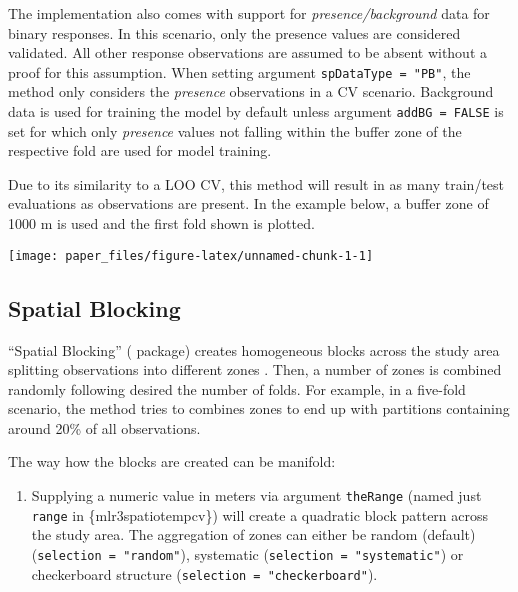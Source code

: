 \documentclass[
]{jss}
\providecommand{\tightlist}{%
  \setlength{\itemsep}{0pt}\setlength{\parskip}{0pt}}
\begin{document}
The implementation also comes with support for
\emph{presence/background} data for binary responses. In this scenario,
only the presence values are considered validated. All other response
observations are assumed to be absent without a proof for this
assumption. When setting argument \texttt{spDataType\ =\ "PB"}, the
method only considers the \emph{presence} observations in a CV scenario.
Background data is used for training the model by default unless
argument \texttt{addBG\ =\ FALSE} is set for which only \emph{presence}
values not falling within the buffer zone of the respective fold are
used for model training.

Due to its similarity to a LOO CV, this method will result in as many
train/test evaluations as observations are present. In the example
below, a buffer zone of 1000 m is used and the first fold shown is
plotted.

\begin{CodeChunk}


\begin{center}\texttt{[image: paper\_files/figure-latex/unnamed-chunk-1-1]} \end{center}

\end{CodeChunk}

\hypertarget{spatial-blocking}{%
\subsection{Spatial Blocking}\label{spatial-blocking}}

``Spatial Blocking'' ( package) creates homogeneous blocks
across the study area splitting observations into different zones
\citep[\citet{wenger2012a}]{bahn2012a}. Then, a number of zones is
combined randomly following desired the number of folds. For example, in
a five-fold scenario, the method tries to combines zones to end up with
partitions containing around 20\% of all observations.

The way how the blocks are created can be manifold:

\begin{enumerate}
\def\labelenumi{\arabic{enumi}.}
\tightlist
\item
  Supplying a numeric value in meters via argument \texttt{theRange}
  (named just \texttt{range} in \{mlr3spatiotempcv\}) will create a
  quadratic block pattern across the study area. The aggregation of
  zones can either be random (default)
  (\texttt{selection\ =\ "random"}), systematic
  (\texttt{selection\ =\ "systematic"}) or checkerboard structure
  (\texttt{selection\ =\ "checkerboard"}).
\end{enumerate}
\end{document}
